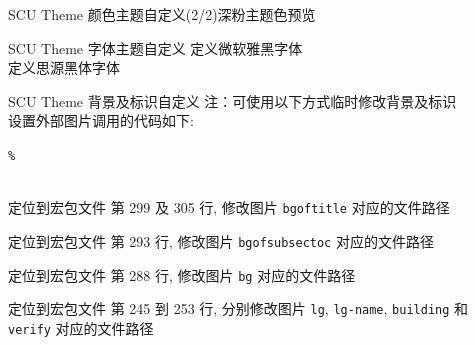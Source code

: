 \begin{frame}{SCU Theme 颜色主题自定义(2/2)}{深粉主题色预览}
\end{frame}


\begin{frame}{SCU Theme 字体主题自定义}
  定义微软雅黑字体 \\

  定义思源黑体字体 \\
\end{frame}

\begin{frame}{SCU Theme 背景及标识自定义}
  注：可使用以下方式临时修改背景及标识\\

  设置外部图片调用的代码如下: 

  \texttt{\%}\\
    \hspace*{1em}\\

  
  定位到宏包文件  第 299 及 305 行, 修改图片 \texttt{bgoftitle} 对应的文件路径\\

  
  定位到宏包文件  第 293 行, 修改图片 \texttt{bgofsubsectoc} 对应的文件路径\\

  
  定位到宏包文件  第 288 行, 修改图片 \texttt{bg} 对应的文件路径\\


  定位到宏包文件  第 245 到 253 行, 分别修改图片 \texttt{lg}, \texttt{lg-name}, \texttt{building} 和 \texttt{verify} 对应的文件路径
\end{frame}

